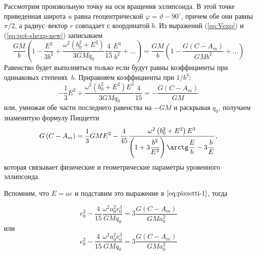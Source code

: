 \documentclass[11pt, a4paper,addpoints]{exam}
\theoremstyle{remark}
\renewcommand{\phi}{\ensuremath{\varphi}}
\renewcommand{\theta}{\vartheta}
\begin{document}
Рассмотрим произвольную точку на оси вращения эллипсоида. В этой точке приведенная широта $u$ равна
геоцентрической $\phi = \theta - 90^\circ$, причем обе они равны $\pi/2$, а радиус--вектор
$r$ совпадает с координатой $b$. Из выражений (\ref{eq:Vexp}) и (\ref{eq:pot-shexp-new}) записываем
\begin{equation}
    \dfrac{GM}{b} \left( 1 - \dfrac{E^2}{3b^2} + \dfrac{\omega^2 \left( b_0^2 + E^2
    \right)}{3GMq_0} \dfrac{4}{15}\dfrac{E^3}{b^2} + \dots \right)
    = \dfrac{GM}{b} \left( 1 - \dfrac{G\left( C - A_m \right)}{GM b^2} + \dots\right)
\end{equation}
Равенство будет выполняться только если будут равны коэффициенты при одинаковых степенях~$b$.
Приравняем коэффициенты при $1/b^3$:
\begin{equation}
   -\dfrac{1}{3}E^2 + \dfrac{\omega^2 \left( b_0^2 + E^2
    \right)E^3}{3GMq_0} \dfrac{4}{15}
    =  - \dfrac{G\left( C - A_m \right)}{GM}
    \label{eq:pizzetti-1}
\end{equation}
или, умножая обе части последнего равенства на $-GM$ и раскрывая $q_0$, получаем знаменитую формулу Пиццетти
\begin{equation}
    G\left( C - A_m \right) = \dfrac{1}{3} GM E^2 - \dfrac{4}{45} \dfrac{\omega^2 \left( b_0^2 +
    E^2\right) E^3}{
    \left( 1 + 3\dfrac{b^2}{E^2} \right)\arctg\dfrac{E}{b} - 3\dfrac{b}{E}},
    \label{eq:pizzetti}
\end{equation}
которая связывает физические и геометрические параметры уровенного эллипсоида.

Вспомним, что $E = ae$ и подставим это выражение в $\ref{eq:pizzetti-1}$, тогда

\begin{equation*}
    e_0^2 - \dfrac{4}{15}\dfrac{\omega^2 a_0^2 e_0^3}{GM q_0} = 3\dfrac{G\left( C - A_m
    \right)}{GM a_0^2}
\end{equation*}
или
\begin{equation*}
    e_0^2 - \dfrac{4}{15}\dfrac{\omega^2 a_0^2 e_0^3}{GM q_0} = 3\dfrac{G\left( C - A_m
    \right)}{GM a_0^2}
\end{equation*}
\end{document}
